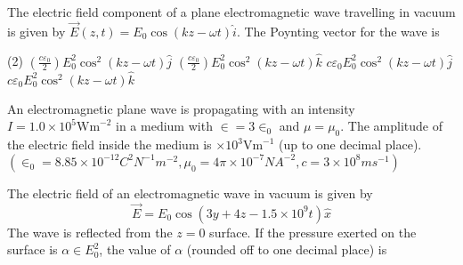 \begin{enumerate}
\begin{minipage}{\textwidth}
	\item The electric field component of a plane electromagnetic wave travelling in vacuum is given by $\vec{E}(z, t)=E_{0} \cos (k z-\omega t) \hat{i}$. The Poynting vector for the wave is
\end{minipage}
\begin{tasks}(2)
	\task[\textbf{A.}] $\left(\frac{c \varepsilon_{0}}{2}\right) E_{0}^{2} \cos ^{2}(k z-\omega t) \hat{j}$
	\task[\textbf{B.}]$\left(\frac{c \varepsilon_{0}}{2}\right) E_{0}^{2} \cos ^{2}(k z-\omega t) \hat{k}$
	\task[\textbf{C.}] $c \varepsilon_{0} E_{0}^{2} \cos ^{2}(k z-\omega t) \hat{j}$
	\task[\textbf{D.}]$c \varepsilon_{0} E_{0}^{2} \cos ^{2}(k z-\omega t) \hat{k}$
\end{tasks}
\begin{minipage}{\textwidth}
	\item An electromagnetic plane wave is propagating with an intensity $I=1.0 \times 10^{5} \mathrm{Wm}^{-2}$ in a medium with $\in=3 \in_{0}$ and $\mu=\mu_{0}$. The amplitude of the electric field inside the medium is $\times 10^{3} \mathrm{Vm}^{-1}$ (up to one decimal place). $\left(\in_{0}=8.85 \times 10^{-12} C^{2} N^{-1} m^{-2}, \mu_{0}=4 \pi \times 10^{-7} N A^{-2}, c=3 \times 10^{8} m s^{-1}\right)$
\end{minipage}
\begin{minipage}{\textwidth}
	\item The electric field of an electromagnetic wave in vacuum is given by
	$$
	\vec{E}=E_{0} \cos \left(3 y+4 z-1.5 \times 10^{9} t\right) \hat{x}
	$$
	The wave is reflected from the $z=0$ surface. If the pressure exerted on the surface is $\alpha \in E_{0}^{2}$, the value of $\alpha$ (rounded off to one decimal place) is
\end{minipage}
 \end{enumerate}


